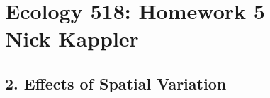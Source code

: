 \documentclass[11pt]{amsart}
\begin{document}
\sffamily
\section*{Ecology 518: Homework 5\\ Nick Kappler}
\subsection*{2. Effects of Spatial Variation}
\end{document}
